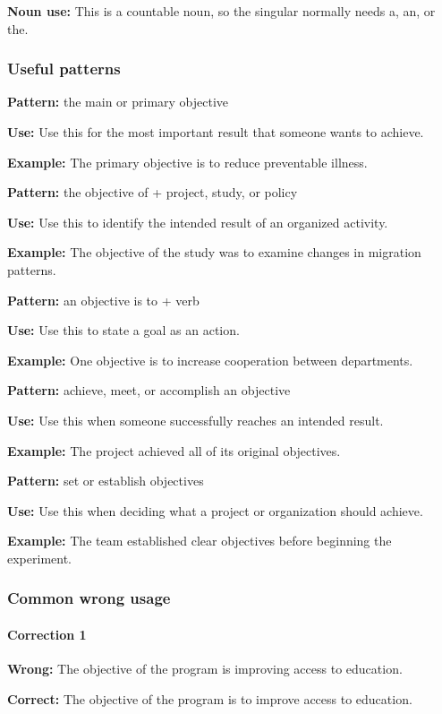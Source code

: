 \documentclass[11pt]{article}
\begin{document}
\textbf{Noun use:} This is a countable noun, so the singular normally needs a, an, or the.

\subsubsection{Useful patterns}
\textbf{Pattern:} the main or primary objective

\textbf{Use:} Use this for the most important result that someone wants to achieve.

\textbf{Example:} The primary objective is to reduce preventable illness.

\textbf{Pattern:} the objective of + project, study, or policy

\textbf{Use:} Use this to identify the intended result of an organized activity.

\textbf{Example:} The objective of the study was to examine changes in migration patterns.

\textbf{Pattern:} an objective is to + verb

\textbf{Use:} Use this to state a goal as an action.

\textbf{Example:} One objective is to increase cooperation between departments.

\textbf{Pattern:} achieve, meet, or accomplish an objective

\textbf{Use:} Use this when someone successfully reaches an intended result.

\textbf{Example:} The project achieved all of its original objectives.

\textbf{Pattern:} set or establish objectives

\textbf{Use:} Use this when deciding what a project or organization should achieve.

\textbf{Example:} The team established clear objectives before beginning the experiment.

\subsubsection{Common wrong usage}
\paragraph{Correction 1}
\textbf{Wrong:} The objective of the program is improving access to education.

\textbf{Correct:} The objective of the program is to improve access to education.
\end{document}
